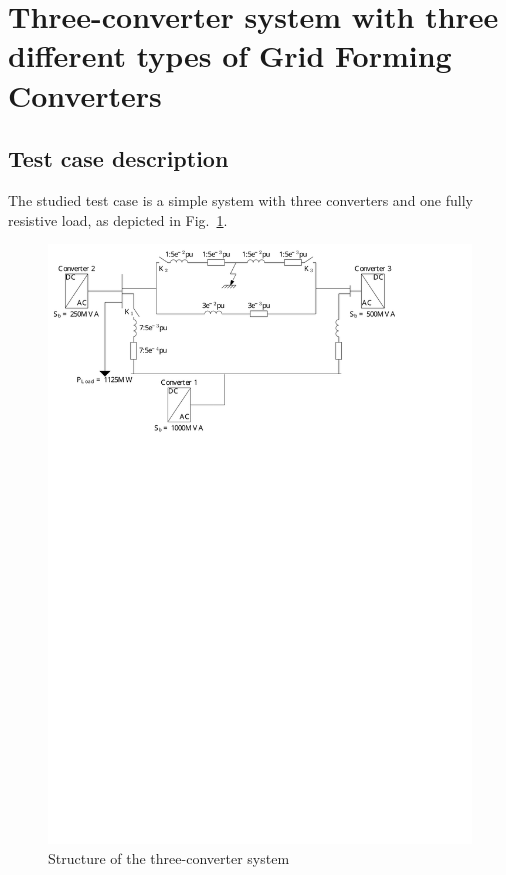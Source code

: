 \documentclass[a4paper, 12pt]{report}
\begin{document}
\chapter*{Three-converter system with three different types of Grid Forming Converters}

\section*{Test case description}

The studied test case is a simple system with three converters and one fully resistive load, as depicted in Fig.~\ref{ThreeConv}.

\begin{figure}[H]
\begin{center}
\includegraphics[width=\textwidth]{ThreeConvISGT}
\end{center}
\caption{Structure of the three-converter system\label{ThreeConv}}
\end{figure}
\end{document}
